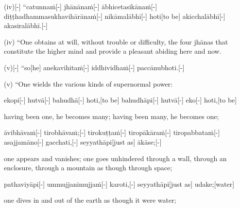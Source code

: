 \begin{samepage}
\begingl[glneveryline={\PaliGlossA,\PaliGlossB}]
(iv)[-] “catunnaṁ[-] jhānānaṁ[-] ābhicetasikānaṁ[-] diṭṭhadhammasukhavihārānaṁ[-] nikāmalābhī[-] hoti[to be] akicchalābhī[-] akasiralābhī.[-]
\endgl
\nopagebreak
\linespread{0.5}
\begin{spacin}{0.2}
{\PaliGlossFT (iv) “One obtains at will, without trouble or difficulty, the four jhānas that constitute the higher mind and  provide a pleasant abiding here and now.}
\end{spacin}
\vskip 12pt
\end{samepage}
\begin{samepage}
\begingl[glneveryline={\PaliGlossA,\PaliGlossB}]
(v)[-] “so[he] anekavihitaṁ[-] iddhividhaṁ[-] paccānubhoti.[-]
\endgl
\nopagebreak
\linespread{0.5}
\begin{spacin}{0.2}
{\PaliGlossFT (v) “One wields the various kinds of supernormal power:}
\end{spacin}
\vskip 12pt
\end{samepage}
\begin{samepage}
\begingl[glneveryline={\PaliGlossA,\PaliGlossB}]
ekopi[-] hutvā[-] bahudhā[-] hoti,[to be] bahudhāpi[-] hutvā[-] eko[-] hoti,[to be]
\endgl
\nopagebreak
\linespread{0.5}
\begin{spacin}{0.2}
{\PaliGlossFT having been one, he becomes many; having been many, he becomes one;}
\end{spacin}
\vskip 12pt
\end{samepage}
\begin{samepage}
\begingl[glneveryline={\PaliGlossA,\PaliGlossB}]
āvibhāvaṁ[-] tirobhāvaṁ;[-] tirokuṭṭaṁ[-] tiropākāraṁ[-] tiropabbataṁ[-] asajjamāno[-] gacchati,[-] seyyathāpi[just as] ākāse;[-]
\endgl
\nopagebreak
\linespread{0.5}
\begin{spacin}{0.2}
{\PaliGlossFT one appears and vanishes; one goes unhindered through a wall, through an enclosure, through a mountain as though through space;}
\end{spacin}
\vskip 12pt
\end{samepage}
\begin{samepage}
\begingl[glneveryline={\PaliGlossA,\PaliGlossB}]
pathaviyāpi[-] ummujjanimujjaṁ[-] karoti,[-] seyyathāpi[just as] udake;[water]
\endgl
\nopagebreak
\linespread{0.5}
\begin{spacin}{0.2}
{\PaliGlossFT one dives in and out of the earth as though it were water;}
\end{spacin}
\vskip 12pt
\end{samepage}
